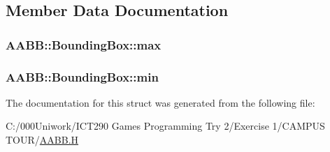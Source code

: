 \subsection{Member Data Documentation}
\subsubsection[{\texorpdfstring{max}{max}}]{ A\+A\+B\+B\+::\+Bounding\+Box\+::max}\hypertarget{struct_a_a_b_b_1_1_bounding_box_a3eab345c474818852c6fc60fa78b9dd4}{}\label{struct_a_a_b_b_1_1_bounding_box_a3eab345c474818852c6fc60fa78b9dd4}
\subsubsection[{\texorpdfstring{min}{min}}]{ A\+A\+B\+B\+::\+Bounding\+Box\+::min}\hypertarget{struct_a_a_b_b_1_1_bounding_box_a47ffd944b2b41d2ebd1fee2f6d16a6d4}{}\label{struct_a_a_b_b_1_1_bounding_box_a47ffd944b2b41d2ebd1fee2f6d16a6d4}


The documentation for this struct was generated from the following file\+:\begin{DoxyCompactItemize}
\item 
C\+:/000\+Uniwork/\+I\+C\+T290 Games Programming Try 2/\+Exercise 1/\+C\+A\+M\+P\+U\+S T\+O\+U\+R/\hyperlink{_a_a_b_b_8_h}{A\+A\+B\+B.\+H}\end{DoxyCompactItemize}
